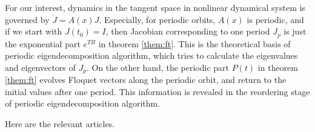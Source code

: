 For our interest, dynamics in the tangent space
in nonlinear dynamical system is governed by $\dot{J} = A(x)J$.
Especially, for periodic orbits, $A(x)$ is periodic, and if we start
with $J(t_0) = I$, then Jacobian corresponding to one period $J_p$ is
just the exponential part $e^{TB}$ in theorem \ref{them:ft}.
This is the theoretical basis of periodic eigendecomposition algorithm,
which tries to calculate the eigenvalues and eigenvectors of $J_p$.
On the other hand, the periodic part $P(t)$ in theorem \ref{them:ft}
evolves Floquet vectors along the periodic orbit, and return to
the initial values after one period. This information is revealed
in the reordering stage of periodic eigendecomposition algorithm.


\newpage

 Here are the relevant articles.

